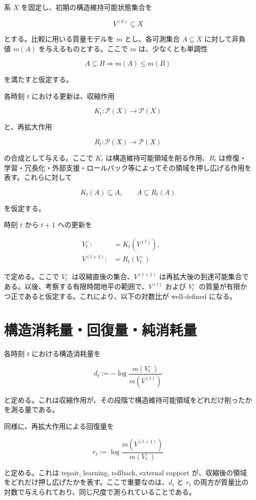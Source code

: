 \documentclass[12pt,a4paper]{article}
\begin{document}
系 \(X\) を固定し、初期の構造維持可能状態集合を

\[
V^{(0)} \subseteq X
\]

とする。比較に用いる質量モデルを \(m\) とし、各可測集合 \(A \subseteq X\) に対して非負値 \(m(A)\) を与えるものとする。ここで \(m\) は、少なくとも単調性

\[
A \subseteq B \Longrightarrow m(A) \le m(B)
\]

を満たすと仮定する。

各時刻 \(t\) における更新は、収縮作用

\[
K_{t} : \mathcal P(X) \to \mathcal P(X)
\]

と、再拡大作用

\[
R_{t} : \mathcal P(X) \to \mathcal P(X)
\]

の合成として与える。ここで \(K_{t}\) は構造維持可能領域を削る作用、\(R_{t}\) は修復・学習・冗長化・外部支援・ロールバック等によってその領域を押し広げる作用を表す。これらに対して

\[
K_{t}(A) \subseteq A, \qquad A \subseteq R_{t}(A)
\]

を仮定する。

時刻 \(t\) から \(t+1\) への更新を

\[
\begin{aligned}
V_{t}^- :&= K_{t}(V^{(t)}), \qquad \\
V^{(t+1)} :&= R_{t}(V_{t}^-)
\end{aligned}
\]

で定める。ここで \(V_{t}^-\) は収縮直後の集合、\(V^{(t+1)}\) は再拡大後の到達可能集合である。以後、考察する有限時間地平の範囲で、\(V^{(t)}\) および \(V_{t}^-\) の質量が有限かつ正であると仮定する。これにより、以下の対数比が well-defined になる。

\section{構造消耗量・回復量・純消耗量}\label{ux69cbux9020ux6d88ux8017ux91cfux56deux5fa9ux91cfux7d14ux6d88ux8017ux91cf}

各時刻 \(t\) における構造消耗量を

\[
d_{t} := - \log \frac{m(V_{t}^-)}{m(V^{(t)})}
\]

と定める。これは収縮作用が、その段階で構造維持可能領域をどれだけ削ったかを測る量である。

同様に、再拡大作用による回復量を

\[
r_{t} := \log \frac{m(V^{(t+1)})}{m(V_{t}^-)}
\]

と定める。これは repair, learning, rollback, external support が、収縮後の領域をどれだけ押し広げたかを表す。ここで重要なのは、\(d_{t}\) と \(r_{t}\) の両方が質量比の対数で与えられており、同じ尺度で測られていることである。
\end{document}
